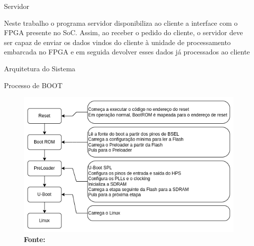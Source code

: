 \documentclass[10pt]{beamer}
\begin{document}

\begin{frame}{Servidor}
	\begin{alertblock}{}
		\vspace{0.2cm}
	    \begin{justify}
			Neste trabalho o programa servidor disponibiliza ao cliente a interface com o FPGA presente no SoC. Assim, ao receber o pedido do cliente, o servidor deve ser capaz de enviar os dados vindos do cliente à unidade de processamento embarcada no FPGA e em seguida devolver esses dados já processados ao cliente
	    \end{justify}
	\end{alertblock}
\end{frame}

\begin{frame}{Arquitetura do Sistema}
    \begin{alertblock}{Processo de BOOT}
		\vspace{0.2cm}
		\begin{figure}[h]
			\begin{center}
				\includegraphics[scale=0.45]{imagens/embeddedLinux.png}\\
				{\footnotesize \textbf{Fonte:}}
			\end{center}
			\label{fig:boot}
		\end{figure}
	\end{alertblock}
\end{frame}
\end{document}

